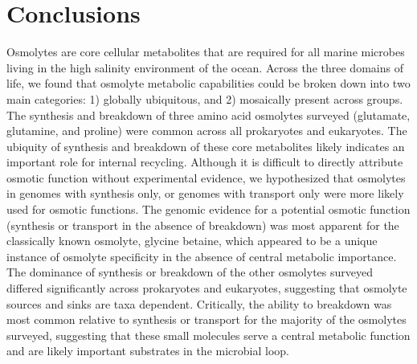 \documentclass[utf8]{frontiersSCNS} %
\begin{document}
\section{Conclusions}

Osmolytes are core cellular metabolites that are required for all marine microbes living in the high salinity environment of the ocean. Across the three domains of life, we found that osmolyte metabolic capabilities could be broken down into two main categories: 1) globally ubiquitous, and 2) mosaically present across groups. The synthesis and breakdown of three amino acid osmolytes surveyed (glutamate, glutamine, and proline) were common across all prokaryotes and eukaryotes. The ubiquity of synthesis and breakdown of these core metabolites likely indicates an important role for internal recycling. Although it is difficult to directly attribute osmotic function without experimental evidence, we hypothesized that osmolytes in genomes with synthesis only, or genomes with transport only were more likely used for osmotic functions. The genomic evidence for a potential osmotic function (synthesis or transport in the absence of breakdown) was most apparent for the classically known osmolyte, glycine betaine, which appeared to be a unique instance of osmolyte specificity in the absence of central metabolic importance. The dominance of synthesis or breakdown of the other osmolytes surveyed differed significantly across prokaryotes and eukaryotes, suggesting that osmolyte sources and sinks are taxa dependent. Critically, the ability to breakdown was most common relative to synthesis or transport for the majority of the osmolytes surveyed, suggesting that these small molecules serve a central metabolic function and are likely important substrates in the microbial loop.
\end{document}
